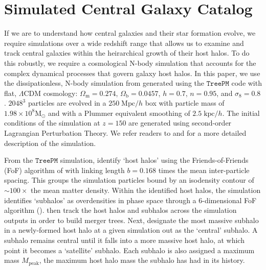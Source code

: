 \documentclass[iop,apj,tighten,twocolappendix,numberedappendix]{emulateapj}
\begin{document}
\section{Simulated Central Galaxy Catalog} \label{sec:treepm}
If we are to understand how central galaxies and their star formation 
evolve, we require simulations over a wide redshift range that allows 
us to examine and track central galaxies within the heirarchical growth 
of their host halos. To do this robustly, we require a cosmological 
N-body simulation that accounts for the complex dynamical processes 
that govern galaxy host halos. In this paper, we use the dissipationless, 
N-body simulation from \cite{Wetzel:2013aa} generated using the 
\cite{White:2002aa} $\mathtt{TreePM}$ code with flat,
$\Lambda$CDM cosmology: $\Omega_\mathrm{m} = 0.274$, 
$\Omega_\mathrm{b} = 0.0457$, $h = 0.7$, $n = 0.95$, and
$\sigma_8 = 0.8$. $2048^3$ particles are evolved in a $250\;\mathrm{Mpc}/h$ 
box with particle mass of $1.98 \times 10^{8}\mathrm{M}_\odot$ and with a Plummer 
equivalent smoothing of $2.5\;\mathrm{kpc}/h$. The initial conditions of 
the simulation at $z = 150$ are generated using second-order Lagrangian 
Perturbation Theory. We refer readers to \cite{Wetzel:2013aa} and 
\cite{Wetzel:2014aa} for a more detailed description of the simulation. 

From the $\mathtt{TreePM}$ simulation, \cite{Wetzel:2013aa} identify 
`host halos' using the Friends-of-Friends (FoF) 
algorithm of \cite{Davis:1985aa} with linking length $b = 0.168$ times the mean 
inter-particle spacing. This groups the simulation particles bound by an isodensity 
contour of $\sim 100\times$ the mean matter density. Within the identified host halos, 
the simulation identifies `subhalos' as overdensities in phase space 
through a 6-dimensional FoF algorithm (\citealt{White:2010aa}). 
\cite{Wetzel:2013aa} then track the host halos and subhalos
across the simulation outputs in order to build merger trees. 
Next, \cite{Wetzel:2013aa} designate the most massive subhalo 
in a newly-formed host halo at a given 
simulation out as the `central' subhalo. A subhalo remains central until it falls 
into a more massive host halo, at which point it becomes a `satellite' subhalo.  
Each subhalo is also assigned a maximum mass $M_\mathrm{peak}$, the 
maximum host halo mass the subhalo has had in its history. 
\end{document}
